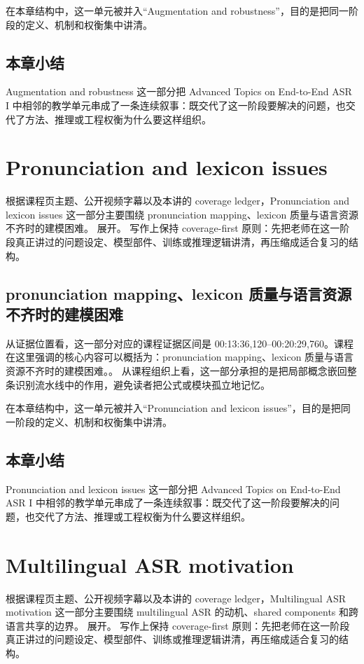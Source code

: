 \documentclass[a4paper]{article}
\begin{document}
在本章结构中，这一单元被并入“Augmentation and robustness”，目的是把同一阶段的定义、机制和权衡集中讲清。

\subsection{本章小结}
Augmentation and robustness 这一部分把 Advanced Topics on End-to-End ASR I 中相邻的教学单元串成了一条连续叙事：既交代了这一阶段要解决的问题，也交代了方法、推理或工程权衡为什么要这样组织。

\section{Pronunciation and lexicon issues}
根据课程页主题、公开视频字幕以及本讲的 coverage ledger，Pronunciation and lexicon issues 这一部分主要围绕 pronunciation mapping、lexicon 质量与语言资源不齐时的建模困难。 展开。
写作上保持 coverage-first 原则：先把老师在这一阶段真正讲过的问题设定、模型部件、训练或推理逻辑讲清，再压缩成适合复习的结构。

\subsection{pronunciation mapping、lexicon 质量与语言资源不齐时的建模困难}
从证据位置看，这一部分对应的课程证据区间是 00:13:36,120--00:20:29,760。课程在这里强调的核心内容可以概括为：pronunciation mapping、lexicon 质量与语言资源不齐时的建模困难。。
从课程组织上看，这一部分承担的是把局部概念嵌回整条识别流水线中的作用，避免读者把公式或模块孤立地记忆。

在本章结构中，这一单元被并入“Pronunciation and lexicon issues”，目的是把同一阶段的定义、机制和权衡集中讲清。

\subsection{本章小结}
Pronunciation and lexicon issues 这一部分把 Advanced Topics on End-to-End ASR I 中相邻的教学单元串成了一条连续叙事：既交代了这一阶段要解决的问题，也交代了方法、推理或工程权衡为什么要这样组织。

\section{Multilingual ASR motivation}
根据课程页主题、公开视频字幕以及本讲的 coverage ledger，Multilingual ASR motivation 这一部分主要围绕 multilingual ASR 的动机、shared components 和跨语言共享的边界。 展开。
写作上保持 coverage-first 原则：先把老师在这一阶段真正讲过的问题设定、模型部件、训练或推理逻辑讲清，再压缩成适合复习的结构。
\end{document}
